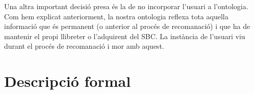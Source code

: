 Una altra important decisió presa és la de no incorporar l'usuari a l'ontologia. Com hem explicat anteriorment, la nostra ontologia reflexa tota aquella informació que és permanent (o anterior al procés de recomanació) i que ha de mantenir el propi llibreter o l'adquirent del SBC. La instància de l'usuari viu durant el procés de recomanació i mor amb aquest.

\section{Descripció formal}



